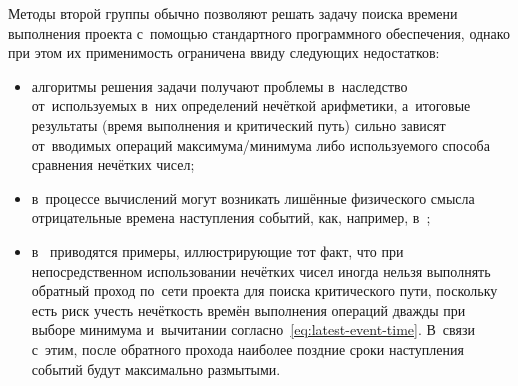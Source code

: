 Методы второй группы обычно позволяют решать задачу поиска времени выполнения проекта с~помощью стандартного программного обеспечения, однако при этом их применимость ограничена ввиду следующих недостатков:
\begin{itemize}
  \item алгоритмы решения задачи получают проблемы в~наследство от~используемых в~них определений нечёткой арифметики, а~итоговые результаты (время выполнения и критический путь) сильно зависят от~вводимых операций максимума/минимума либо используемого способа сравнения нечётких чисел;
  \item в~процессе вычислений могут возникать лишённые физического смысла отрицательные времена наступления событий, как, например, в~\cite{Liang_Han_FCPM};
  \item в~\cite{Leondes, Zielinski_Preprint} приводятся примеры, иллюстрирующие тот факт, что при непосредственном использовании нечётких чисел иногда нельзя выполнять обратный проход по~сети проекта для поиска критического пути, поскольку есть риск учесть нечёткость времён выполнения операций дважды при выборе минимума и~вычитании согласно~\eqref{eq:latest-event-time}. В~связи с~этим, после обратного прохода наиболее поздние сроки наступления событий будут максимально размытыми.
\end{itemize}

